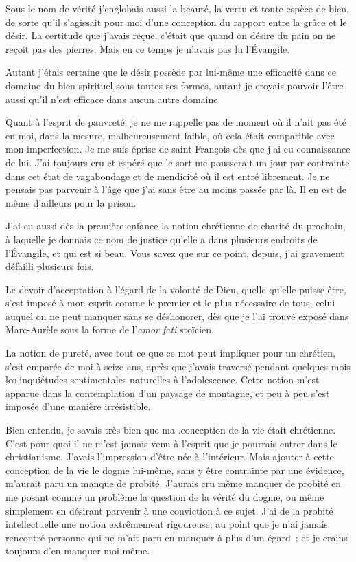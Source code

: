 \documentclass[french,twoside]{book} %
\begin{document}
Sous le nom de vérité j'englobais aussi la beauté, la vertu et toute espèce de bien, de sorte qu'il s'agissait pour moi d'une conception du rapport entre la grâce et le désir. La certitude que j'avais reçue, c'était que quand on désire du pain on ne reçoit pas des pierres. Mais en ce temps je n'avais pas lu l'Évangile.\par
Autant j'étais certaine que le désir possède par lui-même une efficacité dans ce domaine du bien spirituel sous toutes ses formes, autant je croyais pouvoir l'être aussi qu'il n'est efficace dans aucun autre domaine.\par
Quant à l'esprit de pauvreté, je ne me rappelle pas de moment où il n'ait pas été en moi, dans la mesure, malheureusement faible, où cela était compatible avec mon imperfection. Je me suis éprise de saint François dès que j'ai eu connaissance de lui. J'ai toujours cru et espéré que le sort me pousserait un jour par contrainte dans cet état de vagabondage et de mendicité où il est entré librement. Je ne pensais pas parvenir à l'âge que j'ai sans être au moins passée par là. Il en est de même d'ailleurs pour la prison.\par
J'ai eu aussi dès la première enfance la notion chrétienne de charité du prochain, à laquelle je donnais ce nom de justice qu'elle a dans plusieurs endroits de l'Évangile, et qui est si beau. Vous savez que sur ce point, depuis, j'ai gravement défailli plusieurs fois.\par
Le devoir d'acceptation à l'égard de la volonté de Dieu, quelle qu'elle puisse être, s'est imposé à mon esprit comme le premier et le plus nécessaire de tous, celui auquel on ne peut manquer sans se déshonorer, dès que je l'ai trouvé exposé dans Marc-Aurèle sous la forme de l'{\itshape amor fati} stoïcien.\par
La notion de pureté, avec tout ce que ce mot peut impliquer pour un chrétien, s'est emparée de moi à seize ans, après que j'avais traversé pendant quelques mois les inquiétudes sentimentales naturelles à l'adolescence. Cette notion m'est apparue dans la contemplation d'un paysage de montagne, et peu à peu s'est imposée d'une manière irrésistible.\par
Bien entendu, je savais très bien que ma .conception de la vie était chrétienne. C'est pour quoi il ne m'est jamais venu à l'esprit que je pourrais entrer dans le christianisme. J'avais l'impression d'être née à l'intérieur. Mais ajouter à cette conception de la vie le dogme lui-même, sans y être contrainte par une évidence, m'aurait paru un manque de probité. J'aurais cru même manquer de probité en me posant comme un problème la question de la vérité du dogme, ou même simplement en désirant parvenir à une conviction à ce sujet. J'ai de la probité intellectuelle une notion extrêmement rigoureuse, au point que je n'ai jamais rencontré personne qui ne m'ait paru en manquer à plus d'un égard ; et je crains toujours d'en manquer moi-même.\par
\end{document}
